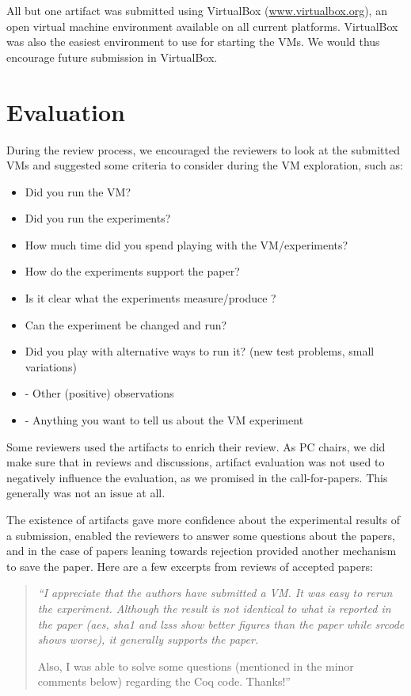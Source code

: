 \documentclass{article}
\begin{document}
All but one artifact was submitted using VirtualBox
(\url{www.virtualbox.org}), an open virtual machine environment available on all
current platforms. VirtualBox was also the easiest environment to use
for starting the VMs. We would thus encourage future submission in
VirtualBox.

\section*{Evaluation}

During the review process, we encouraged the reviewers to look at
the submitted VMs and suggested some criteria to consider during the
VM exploration, such as:
{\small
\begin{itemize}
\item Did you run the VM?
\item Did you run the experiments?
\item How much time did you spend playing with the VM/experiments?
\item How do the experiments support the paper?
\item Is it clear what the experiments measure/produce ?
\item Can the experiment be changed and run?
\item Did you play with alternative ways to run it? (new test problems, small variations)
\item - Other (positive) observations
\item - Anything you want to tell us about the VM experiment
\end{itemize}
}

\noindent
Some reviewers used the artifacts to enrich their review. As PC
chairs, we did make sure that in reviews and discussions, artifact
evaluation was not used to negatively influence the evaluation, as we
promised in the call-for-papers. This generally was not an issue at all.

The existence of artifacts gave more confidence about the experimental
results of a submission, enabled the reviewers to answer some
questions about the papers, and in the case of papers leaning towards
rejection provided another mechanism to save the paper.
Here are a few excerpts from reviews of accepted papers:
\begin{quote}\itshape
``I appreciate that the authors have submitted a VM. It was easy to
 rerun the experiment. Although the result is not identical to what is
 reported in the paper (aes, sha1 and lzss show better figures than the
 paper while srcode shows worse), it generally supports the paper.

 Also, I was able to solve some questions (mentioned in the minor
 comments below) regarding the Coq code. Thanks!''
\end{quote}
\end{document}
